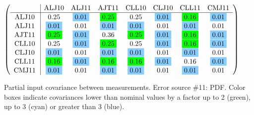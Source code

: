\begin{table}[H]
\scriptsize
\begin{center}
\renewcommand{\arraystretch}{1.1}
\begin{math}\left(\begin{array}{c|ccccccc}
 & \mathrm{ALJ10} & 
\mathrm{ALJ11} & 
\mathrm{AJT11} & 
\mathrm{CLL10} & 
\mathrm{CLJ10} & 
\mathrm{CLL11} & 
\mathrm{CMJ11} \\
\hline
\mathrm{ALJ10} \hspace*{2pt} &       0.25 &  \colorbox{SkyBlue1}{$      0.01$} &  \colorbox{Green1}{$      0.25$} &       0.25 &  \colorbox{SkyBlue1}{$      0.01$} &  \colorbox{Green1}{$      0.16$} &  \colorbox{SkyBlue1}{$      0.01$} \\
\mathrm{ALJ11} \hspace*{2pt} &  \colorbox{SkyBlue1}{$      0.01$} &       0.01 &  \colorbox{SkyBlue1}{$      0.01$} &  \colorbox{SkyBlue1}{$      0.01$} &       0.01 &  \colorbox{SkyBlue1}{$      0.01$} &       0.01 \\
\mathrm{AJT11} \hspace*{2pt} &  \colorbox{Green1}{$      0.25$} &  \colorbox{SkyBlue1}{$      0.01$} &       0.36 &  \colorbox{Green1}{$      0.25$} &  \colorbox{SkyBlue1}{$      0.01$} &  \colorbox{Green1}{$      0.16$} &  \colorbox{SkyBlue1}{$      0.01$} \\
\mathrm{CLL10} \hspace*{2pt} &       0.25 &  \colorbox{SkyBlue1}{$      0.01$} &  \colorbox{Green1}{$      0.25$} &       0.25 &  \colorbox{SkyBlue1}{$      0.01$} &  \colorbox{Green1}{$      0.16$} &  \colorbox{SkyBlue1}{$      0.01$} \\
\mathrm{CLJ10} \hspace*{2pt} &  \colorbox{SkyBlue1}{$      0.01$} &       0.01 &  \colorbox{SkyBlue1}{$      0.01$} &  \colorbox{SkyBlue1}{$      0.01$} &       0.01 &  \colorbox{SkyBlue1}{$      0.01$} &       0.01 \\
\mathrm{CLL11} \hspace*{2pt} &  \colorbox{Green1}{$      0.16$} &  \colorbox{SkyBlue1}{$      0.01$} &  \colorbox{Green1}{$      0.16$} &  \colorbox{Green1}{$      0.16$} &  \colorbox{SkyBlue1}{$      0.01$} &       0.16 &  \colorbox{SkyBlue1}{$      0.01$} \\
\mathrm{CMJ11} \hspace*{2pt} &  \colorbox{SkyBlue1}{$      0.01$} &       0.01 &  \colorbox{SkyBlue1}{$      0.01$} &  \colorbox{SkyBlue1}{$      0.01$} &       0.01 &  \colorbox{SkyBlue1}{$      0.01$} &       0.01 \\
\end{array}\right)\end{math}
\caption{Partial input covariance between measurements. Error source \#11: PDF. Color boxes indicate covariances lower than nominal values by a factor up to 2 (green), up to 3 (cyan) or greater than 3 (blue).}
\renewcommand{\arraystretch}{1}
\end{center}
\end{table}
